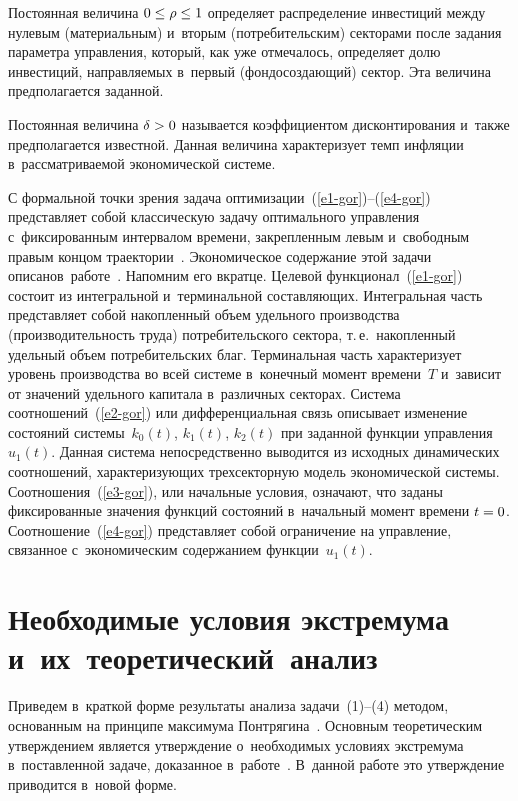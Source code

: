 \begin{multicols}{2}
Постоянная величина $0 \hm\leq \rho \hm\leq 1$ определяет распределение инвестиций 
между нулевым (материальным) и~вторым (потребительским) секторами после задания 
параметра управ\-ле\-ния, который, как уже отмечалось, определяет долю инвестиций, 
направляемых в~первый (фондосоздающий) сектор. Эта величина предполагается заданной.

Постоянная величина $\delta \hm> 0$ называется коэффициентом дисконтирования и~также 
предполагается известной. Данная величина характеризует темп инфляции в~рассматриваемой 
экономической системе.

С формальной точки зрения задача оптимизации~(\ref{e1-gor})--(\ref{e4-gor}) представляет собой классическую задачу
оптимального управ\-ле\-ния с~фиксированным интервалом времени,
закрепленным левым и~свободным правым концом траектории~\cite{2-gor, 1-gor}. 
Эко\-номическое содержание этой задачи описано\linebreak в~работе~\cite{2-gor}. 
Напомним его вкратце. Целевой функционал~(\ref{e1-gor}) 
состоит из интегральной и~терминальной составляющих. Интегральная часть представляет 
собой накопленный объем удельного производства (производительность труда) 
потребительского сектора, т.\,е.\ накопленный удельный объем потребительских благ. 
Терминальная часть характеризует уровень производства во всей сис\-те\-ме в~конечный 
момент времени~$T$ и~зависит от значений удельного капитала в~различных секторах. 
Система соотношений~(\ref{e2-gor}) или дифференциальная связь описывает изменение 
состояний системы~$k_0(t)$, $k_1(t)$, $k_2(t)$ при заданной функции управ\-ле\-ния $u_1(t)$. 
Данная сис\-тема непосредственно выводится из исходных динамических соотношений, 
характеризующих трехсекторную модель экономиче\-ской системы. Соотноше\-ния~(\ref{e3-gor}), 
или начальные условия, означают, что заданы фиксированные значения функций состояний 
в~начальный момент времени $t\hm=0$. Соотношение~(\ref{e4-gor}) 
пред\-став\-ля\-ет собой ограничение на управ\-ле\-ние, связанное с~экономическим содержанием 
функции~$u_1(t)$.

\section{Необходимые условия экстремума и~их~теоретический~анализ}

Приведем в~краткой форме результаты анализа задачи~(1)--(4) методом, основанным на 
принципе максимума Понтрягина~\cite{8-gor, 7-gor, 11-gor}. 
Основным тео\-ре\-ти\-ческим утверждением является утверждение о~необходимых условиях 
экстремума в~по\-став\-лен\-ной задаче, доказанное в~работе~\cite{2-gor}. 
В~данной работе это утверждение приводится  в~новой форме.


\end{multicols}
